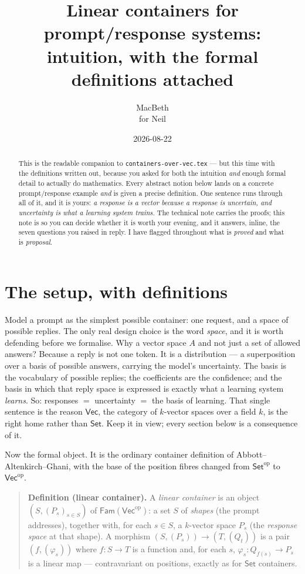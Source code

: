 \documentclass[11pt]{article}
\title{Linear containers for prompt/response systems:\\
intuition, with the formal definitions attached}
\author{MacBeth \\ \small for Neil}
\date{2026-08-22}
\providecommand{\Vec}{}\renewcommand{\Vec}{\mathsf{Vec}}
\newcommand{\Set}{\mathsf{Set}}
\newcommand{\Fam}{\mathsf{Fam}}
\newcommand{\op}{\mathrm{op}}
\newcommand{\fld}{k}
\begin{document}
\maketitle

\begin{abstract}\noindent
This is the readable companion to \texttt{containers-over-vec.tex} --- but this time
with the definitions written out, because you asked for both the intuition
\emph{and} enough formal detail to actually do mathematics. Every abstract notion
below lands on a concrete prompt/response example \emph{and} is given a precise
definition. One sentence runs through all of it, and it is yours: \emph{a response
is a vector because a response is uncertain, and uncertainty is what a learning
system trains.} The technical note carries the proofs; this note is so you can decide
whether it is worth your evening, and it answers, inline, the seven questions you
raised in reply. I have flagged throughout what is \emph{proved} and what is
\emph{proposal}.
\end{abstract}

\section{The setup, with definitions}

Model a prompt as the simplest possible container: one request, and a space of
possible replies. The only real design choice is the word \emph{space}, and it is
worth defending before we formalise. Why a vector space $A$ and not just a set of
allowed answers? Because a reply is not one token. It is a distribution --- a
superposition over a basis of possible answers, carrying the model's uncertainty.
The basis is the vocabulary of possible replies; the coefficients are the
confidence; and the basis in which that reply space is expressed is exactly what a
learning system \emph{learns}. So: responses $=$ uncertainty $=$ the basis of
learning. That single sentence is the reason $\Vec$, the category of $\fld$-vector
spaces over a field $\fld$, is the right home rather than $\Set$. Keep it in view;
every section below is a consequence of it.

Now the formal object. It is the ordinary container definition of Abbott--Altenkirch--Ghani,
with the base of the position fibres changed from $\Set^\op$ to $\Vec^\op$.

\begin{quote}
\textbf{Definition (linear container).} A \emph{linear container} is an object
$(S,(P_s)_{s\in S})$ of $\Fam(\Vec^\op)$: a set $S$ of \emph{shapes} (the prompt
addresses), together with, for each $s\in S$, a $\fld$-vector space $P_s$ (the
\emph{response space} at that shape). A morphism $(S,(P_s))\to(T,(Q_t))$ is a pair
$(f,(\varphi_s))$ where $f\colon S\to T$ is a function and, for each $s$,
$\varphi_s\colon Q_{f(s)}\to P_s$ is a linear map --- contravariant on positions,
exactly as for $\Set$ containers.
\end{quote}
\end{document}
